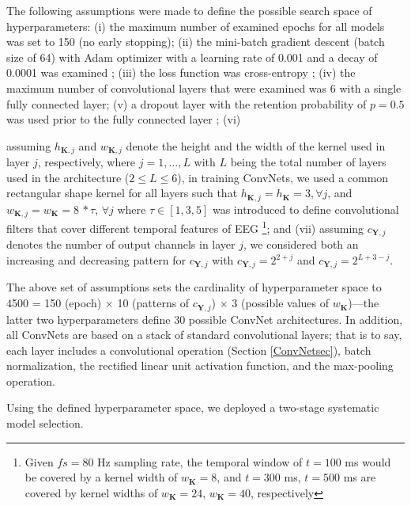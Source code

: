 \documentclass{ieeeaccess}
\begin{document}
    The following assumptions were made to define the possible search space of hyperparameters: (i) the maximum number of examined epochs for all models was set to 150 (no early stopping); (ii) the mini-batch gradient descent (batch size of 64) with Adam optimizer with a learning rate of 0.001 and a decay of 0.0001  was examined \cite{KingmaB14}; (iii) the loss function was cross-entropy \cite{Goodfellow}; (iv) the maximum number of convolutional layers that were examined was 6 with a single fully connected layer; (v) a dropout layer with the retention probability of $p = 0.5$ was used prior to the fully connected layer \cite{Srivastava:2014};
    (vi)  {assuming $h_{\mathbf{K}, j}$ and $w_{\mathbf{K}, j}$ denote the height and the width of the kernel used in layer $j$, respectively, where $j=1,...,L$ with $L$ being the total number of layers used in the architecture ($2\leq L \leq 6$), in training ConvNets, we used a common rectangular shape kernel for all layers such that $h_{\mathbf{K}, j}=h_{\mathbf{K}}= 3, \forall j$, and $w_{\mathbf{K}, j} = w_{\mathbf{K}} = 8 \,*\tau$, $\forall j$ where $\tau \in [1, 3, 5]$ was introduced to define convolutional filters that cover different temporal features of EEG \footnote{Given $fs = 80$ Hz sampling rate, the temporal window of $t = 100$ ms would be covered by a kernel width of $w_{\mathbf{K}} = 8$, and $t = 300$ ms, $t = 500$ ms are covered by kernel widths of $w_{\mathbf{K}} = 24$, $w_{\mathbf{K}} = 40$, respectively};  and (vii) assuming $c_{\mathbf{Y}, j}$ denotes the number of output channels in layer $j$, we considered both an increasing and decreasing pattern for $c_{\mathbf{Y}, j}$ with $c_{\mathbf{Y}, j}=2^{2+j}$ and $c_{\mathbf{Y}, j}=2^{L+3-j}$. 
    
    {The above set of assumptions sets the cardinality of hyperparameter space to 4500 = 150 (epoch) $\times$ 10 (patterns of $c_{\mathbf{Y}, j}$) $\times$ 3 (possible values of $w_{\mathbf{K}}$)---the latter two hyperparameters define 30 possible ConvNet architectures.} In addition, all ConvNets are based on a stack of standard convolutional layers; that is to say, each layer includes a convolutional operation (Section \ref{ConvNetsec}),  batch normalization,  the rectified linear unit activation function,  and the max-pooling operation.  {Using the defined hyperparameter space, we deployed a two-stage systematic model selection. 
    
}}
\end{document}
